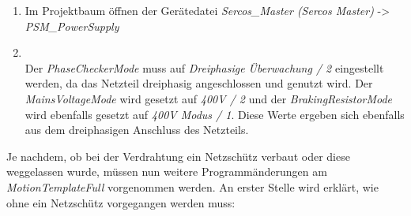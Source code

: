 \documentclass[../../../Bachelorarbeit.tex]{subfiles}
\begin{document}
\begin{enumerate}
    \item Im Projektbaum öffnen der Gerätedatei \textit{Sercos\_Master (Sercos Master)} -> \\ \textit{PSM\_PowerSupply}
    \item \begin{minipage}[t]{\linewidth}
        \raggedright
        \label{fig:my-img37}
    \end{minipage}
    \bigskip \\
    Der \textit{PhaseCheckerMode} muss auf \textit{Dreiphasige Überwachung / 2} eingestellt werden, da das Netzteil dreiphasig angeschlossen und genutzt wird. Der \textit{MainsVoltageMode} wird gesetzt auf \textit{400\si{V} / 2} und der \textit{BrakingResistorMode} wird ebenfalls gesetzt auf \textit{400\si{V} Modus / 1}. Diese Werte ergeben sich ebenfalls aus dem dreiphasigen Anschluss des Netzteils.
\end{enumerate}

Je nachdem, ob bei der Verdrahtung ein Netzschütz verbaut oder diese weggelassen wurde, müssen nun weitere Programmänderungen am \textit{MotionTemplateFull} vorgenommen werden. An erster Stelle wird erklärt, wie ohne ein Netzschütz vorgegangen werden muss:
\end{document}
